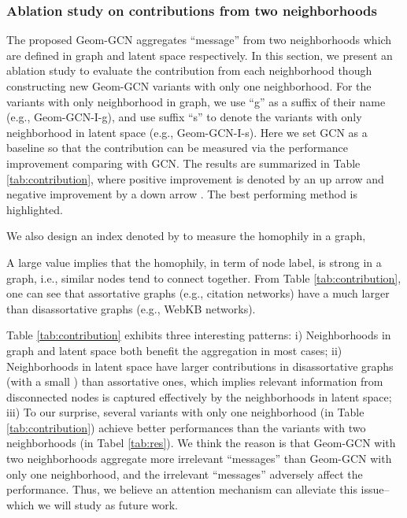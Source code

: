 \documentclass{article} \usepackage{iclr2020_conference,times}
\begin{document}
\vspace{-2mm}
\subsubsection{Ablation study on contributions from two neighborhoods}
\vspace{-1mm}
The proposed Geom-GCN aggregates ``message'' from two neighborhoods which are defined in graph and latent space respectively. 
In this section, we present an ablation study to evaluate the contribution from each neighborhood though constructing new Geom-GCN variants with only one neighborhood. 
For the variants with only neighborhood in graph, we use ``g'' as a suffix of their name (e.g., Geom-GCN-I-g), and use suffix ``s'' to denote the variants with only neighborhood in latent space (e.g., Geom-GCN-I-s).
Here we set GCN as a baseline so that the contribution can be measured via the performance improvement comparing with GCN.
The results are summarized in Table \ref{tab:contribution}, where positive improvement is denoted by an up arrow  and negative improvement by a down arrow . The best performing method is highlighted.

We also design an index denoted by  to measure the homophily in a graph,

A large  value implies that the homophily, in term of node label, is strong in a graph, i.e., similar nodes tend to connect together.
From Table \ref{tab:contribution}, one can see that assortative graphs (e.g., citation networks) have a much larger  than disassortative graphs (e.g., WebKB networks).

Table \ref{tab:contribution} exhibits three interesting patterns: 
i) Neighborhoods in graph and latent space both benefit the aggregation in most cases;  
ii) Neighborhoods in latent space have larger contributions in disassortative graphs (with a small ) than assortative ones, which implies relevant information from disconnected nodes is captured effectively by the neighborhoods in latent space;
iii) To our surprise, several variants with only one neighborhood (in Table \ref{tab:contribution}) achieve better performances than the variants with two neighborhoods (in Tabel \ref{tab:res}). 
We think the reason is that Geom-GCN with two neighborhoods aggregate more irrelevant ``messages'' than Geom-GCN with only one neighborhood, and the 
irrelevant ``messages'' adversely affect the performance. 
Thus, we believe an attention mechanism can alleviate this issue-- which we will study as future work. 
\end{document}
